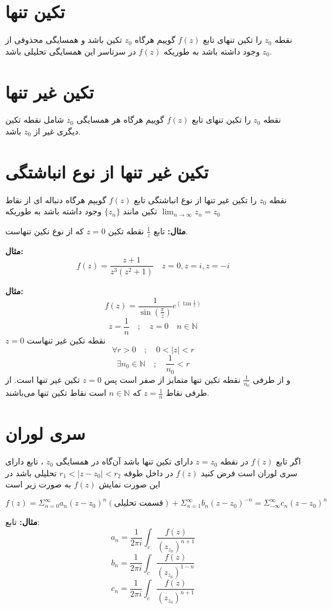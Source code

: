 \documentclass[12pt]{report}
\begin{document}
\section{تکین تنها}
نقطه
$z_0$
را تکین تنهای تابع 
$f(z)$
گوییم هرگاه
$z_0$
تکین باشد و همسایگی محذوفی از
$z_0$
وجود داشته باشد به طوریکه
$f(z)$
در سرتاسر این همسایگی تحلیلی باشد.
\section{تکین غیر تنها}
نقطه
$z_0$
را تکین تنهای تابع
$f(z)$
گوییم هرگاه هر همسایگی 
$z_0$
شامل نقطه تکین دیگری غیر از 
$z_0$
باشد.
\section{تکین غیر تنها از نوع انباشتگی}
نقطه 
$z_0$
را تکین غیر تنها از نوع انباشتگی تابع 
$f(z)$
گوییم هرگاه دنباله ای از نقاط تکین مانند
$\{z_n\}$
وجود داشته باشد به طوریکه 
$\lim_{n \to \infty} z_n = z_0$
\newline

\textbf{مثال:}
تابع
 $\frac{1}{z}$
 نقطه تکین 
 $z = 0$
 که از نوع نکین تنهاست.

\textbf{مثال:}
$$f(z) = \frac{z + 1}{z^3(z^2 + 1)} \quad z =0 , z = i, z = -i$$


\textbf{مثال:}
$$f(z) = \frac{1}{\sin (\frac{\pi}{z})} e^{(\tan \frac{1}{z})}$$
$$z  = \frac{1}{n} \quad ; \quad z = 0 \quad n \in \mathbb{N}$$
$z = 0$
نقطه تکین غیر تنهاست
$$\forall r > 0 \quad ; \quad 0<|z|< r$$
$$\exists n_0 \in \mathbb{N} \quad ;\quad \frac{1}{n_0} < r$$
و از طرفی
$\frac{1}{n_0}$
نقطه تکین تنها متمایز از صفر است پس 
$z = 0$
تکین غیر تنها است.
از طرفی نقاط
$z = \frac{1}{n}$
که 
$n \in \mathbb{N}$
است نقاط تکین تنها می‌باشند.
\section{سری لوران}
اگر تابع
$f(z)$
در نقطه 
$z = z_0$
دارای تکین تنها باشد آن‌گاه در همسایگی 
$z_0$
،
تابع دارای سری لوران است فرض کنید
$f(z)$
در داخل طوقه 
$r_1<|z- z_0| < r_2$
تحلیلی باشد در این صورت نمایش 
$f(z)$
به صورت زیر است


$$f(z) = \Sigma_{n = 0}^{\infty} a_n(z- z_0)^n(\text{قسمت تحلیلی}) +\Sigma_{n = 1}^{\infty} b_n(z- z_0)^{-n} = \Sigma_{-\infty}^{\infty} c_n‌(z- z_0)^{n}$$
\newline

\textbf{مثال:}
تابع:
$$a_n = \frac{1}{2\pi i} \int_{c} \frac{f(z)}{(z_z_0)^{n+1}}$$
$$b_n = \frac{1}{2\pi i} \int_{c} \frac{f(z)}{(z_z_0)^{1 - n}}$$
$$c_n = \frac{1}{2\pi i} \int_{c} \frac{f(z)}{(z_z_0)^{n+1}}$$
\newline
\end{document}

